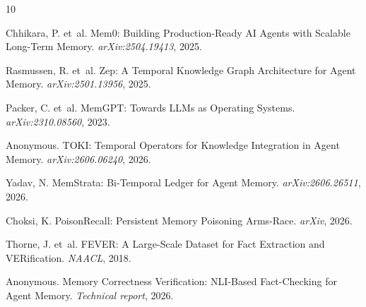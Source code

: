 \documentclass{article}
\begin{document}
\begin{thebibliography}{10}

Chhikara, P. et~al.
\newblock Mem0: Building Production-Ready AI Agents with Scalable Long-Term Memory.
\newblock \emph{arXiv:2504.19413}, 2025.

Rasmussen, R. et~al.
\newblock Zep: A Temporal Knowledge Graph Architecture for Agent Memory.
\newblock \emph{arXiv:2501.13956}, 2025.

Packer, C. et~al.
\newblock MemGPT: Towards LLMs as Operating Systems.
\newblock \emph{arXiv:2310.08560}, 2023.

Anonymous.
\newblock TOKI: Temporal Operators for Knowledge Integration in Agent Memory.
\newblock \emph{arXiv:2606.06240}, 2026.

Yadav, N.
\newblock MemStrata: Bi-Temporal Ledger for Agent Memory.
\newblock \emph{arXiv:2606.26511}, 2026.

Choksi, K.
\newblock PoisonRecall: Persistent Memory Poisoning Arms-Race.
\newblock \emph{arXiv}, 2026.

Thorne, J. et~al.
\newblock FEVER: A Large-Scale Dataset for Fact Extraction and VERification.
\newblock \emph{NAACL}, 2018.

Anonymous.
\newblock Memory Correctness Verification: NLI-Based Fact-Checking for Agent Memory.
\newblock \emph{Technical report}, 2026.

\end{thebibliography}
\end{document}
